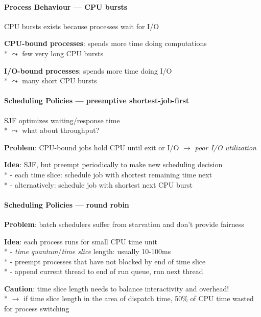 \paragraph{Process Behaviour --- CPU bursts}
\begin{items}
  \item CPU bursts exists because processes wait for I/O
  \item \textbf{CPU-bound processes}: spends more time doing computations \\*
    \( \leadsto \) few very long CPU bursts
  \item \textbf{I/O-bound processes}: spends more time doing I/O \\*
    \( \leadsto \) many short CPU bursts
\end{items}

\paragraph{Scheduling Policies --- preemptive shortest-job-first}
\begin{items}
  \item SJF optimizes waiting/response time \\*
    \( \leadsto \) what about throughput?
  \item \textbf{Problem}: CPU-bound jobs hold CPU until exit or I/O \( \to \) \emph{poor I/O utilization}
  \item \textbf{Idea}: SJF, but preempt periodically to make new scheduling decision \\*
    - each time slice: schedule job with shortest remaining time next \\*
    - alternatively: schedule job with shortest next CPU burst
\end{items}

\paragraph{Scheduling Policies --- round robin}
\begin{items}
  \item \textbf{Problem}: batch schedulers suffer from starvation and don't provide fairness
  \item \textbf{Idea}: each process runs for small CPU time unit \\*
    - \emph{time quantum}/\emph{time slice} length: usually 10-100ms \\*
    - preempt processes that have not blocked by end of time slice \\*
    - append current thread to end of run queue, run next thread
  \item \textbf{Caution}: time slice length needs to balance interactivity and overhead! \\*
    \( \to \) if time slice length in the area of dispatch time, 50\% of CPU time wasted for process switching
\end{items}

